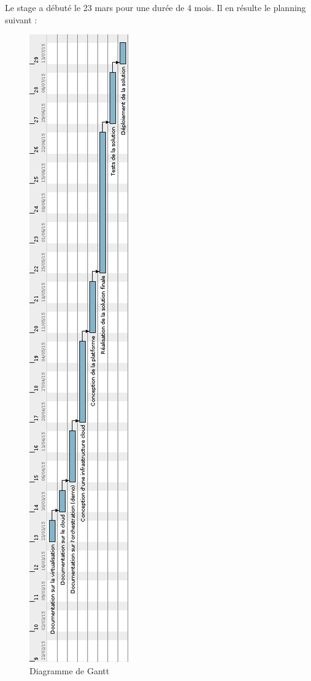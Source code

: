 \begin{onehalfspace}
Le stage a débuté le 23 mars pour une durée de 4 mois. Il en résulte le planning suivant :

\begin{figure}[H]
\centering
\includegraphics [scale=0.5]{chapitre1/assets/gantt.png}
\caption{Diagramme de Gantt}
\end{figure}


\end{onehalfspace}
